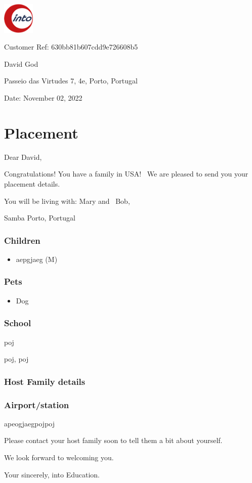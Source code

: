 \documentclass{article}
\begin{document}
\noindent\includegraphics[width=1.5cm]{../logo.png}\par\vspace{1cm}\noindent Customer Ref: 630bb81b607cdd9e726608b5\par\medskip\noindent David God\par\noindent Passeio das Virtudes 7, 4e, Porto, Portugal\par\medskip\noindent Date: November 02, 2022\par\vspace{1cm}\section*{Placement}\noindent Dear David,\par\smallskip \noindent Congratulations! You have a family in USA! \
         We are pleased to send you your placement details.\par\smallskip \noindent You will be living with: Mary and \
        Bob,\par\smallskip \noindent Samba Porto,         Portugal\par\smallskip \noindent \subsubsection*{Children}\begin{itemize}\item aepgjaeg (M)\end{itemize}\subsubsection*{Pets}\begin{itemize}\item Dog\end{itemize}\subsubsection*{School}\noindent poj\par\noindent  poj,         poj\par\subsubsection*{Host Family details}\subsubsection*{Airport/station}\noindent apeogjaegpoj\noindent poj\par\bigskip \noindent Please contact your host family soon to tell them a bit about yourself.\
        \par\smallskip \noindent We look forward to welcoming you.\par\smallskip\noindent Your sincerely, into Education.
\end{document}
